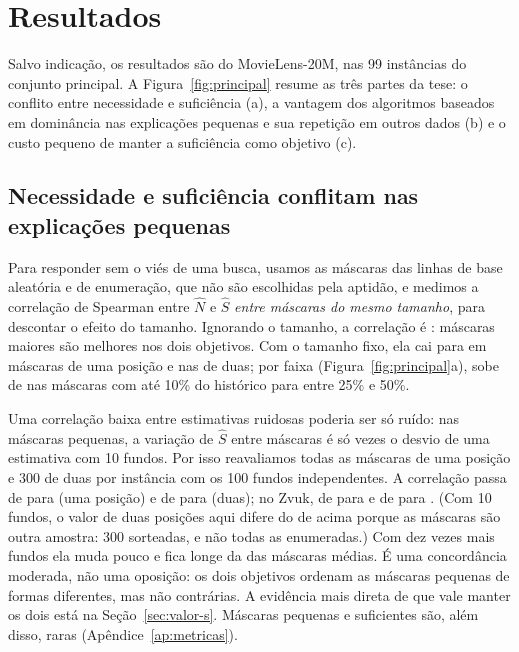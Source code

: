 \section{Resultados}
\label{sec:resultados}

Salvo indicação, os resultados são do MovieLens-20M, nas 99 instâncias do
conjunto principal. A Figura~\ref{fig:principal} resume as três partes da
tese: o conflito entre necessidade e suficiência (a), a vantagem dos
algoritmos baseados em dominância nas explicações pequenas e sua repetição em
outros dados (b) e o custo pequeno de manter a suficiência como objetivo (c).


\subsection{Necessidade e suficiência conflitam nas explicações pequenas}
\label{sec:conflito}

Para responder sem o viés de uma busca, usamos as máscaras das linhas de base
aleatória e de enumeração, que não são escolhidas pela aptidão, e medimos a
correlação de Spearman entre $\hat N$ e $\hat S$ \emph{entre máscaras do mesmo
tamanho}, para descontar o efeito do tamanho. Ignorando o tamanho, a correlação
é : máscaras maiores são melhores nos dois objetivos. Com o
tamanho fixo, ela cai para  em máscaras de uma posição e
 nas de duas; por faixa (Figura~\ref{fig:principal}a), sobe de
 nas máscaras com até 10\% do histórico para  entre
25\% e 50\%.

Uma correlação baixa entre estimativas ruidosas poderia ser só ruído: nas
máscaras pequenas, a variação de $\hat S$ entre máscaras é só 
vezes o desvio de uma estimativa com 10 fundos. Por isso reavaliamos todas as
máscaras de uma posição e 300 de duas por instância com os 100 fundos
independentes. A correlação passa de  para
 (uma posição) e de  para
 (duas); no Zvuk, de  para
 e de  para
. (Com 10 fundos, o valor de duas posições aqui difere
do de  acima porque as máscaras são outra amostra: 300 sorteadas,
e não todas as enumeradas.) Com dez vezes mais fundos ela muda pouco e fica longe
da das máscaras médias. É uma concordância moderada, não uma oposição: os dois
objetivos ordenam as máscaras pequenas de formas diferentes, mas não
contrárias. A evidência mais direta de que vale manter os dois está na
Seção~\ref{sec:valor-s}. Máscaras pequenas e suficientes são, além disso,
raras (Apêndice~\ref{ap:metricas}).

